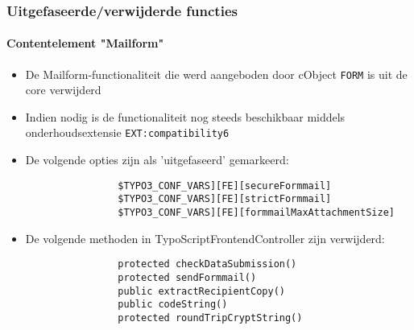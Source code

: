 \begin{frame}[fragile]
	\frametitle{Uitgefaseerde/verwijderde functies}
	\framesubtitle{Contentelement "Mailform"}

	\begin{itemize}

		\item De Mailform-functionaliteit die werd aangeboden door cObject \texttt{FORM} is uit de core verwijderd
		
		\item Indien nodig is de functionaliteit nog steeds beschikbaar middels onderhoudsextensie \texttt{EXT:compatibility6}

		\item De volgende opties zijn als 'uitgefaseerd' gemarkeerd:

			\begin{lstlisting}
				$TYPO3_CONF_VARS][FE][secureFormmail]
				$TYPO3_CONF_VARS][FE][strictFormmail]
				$TYPO3_CONF_VARS][FE][formmailMaxAttachmentSize]
			\end{lstlisting}

		\item De volgende methoden in TypoScriptFrontendController zijn verwijderd:

			\begin{lstlisting}
				protected checkDataSubmission()
				protected sendFormmail()
				public extractRecipientCopy()
				public codeString()
				protected roundTripCryptString()
			\end{lstlisting}

	\end{itemize}

\end{frame}


